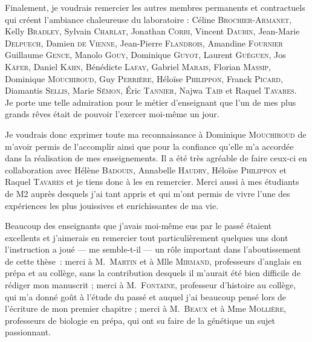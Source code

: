 Finalement, je voudrais remercier les autres membres permanents et contractuels qui créent l'ambiance chaleureuse du laboratoire : 
Céline \textsc{Brochier-Armanet},
Kelly \textsc{Bradley},
Sylvain \textsc{Charlat},
Jonathan \textsc{Corbi},
Vincent \textsc{Daubin},
Jean-Marie \textsc{Delpuech},
Damien \textsc{de Vienne},
Jean-Pierre \textsc{Flandrois},
Amandine \textsc{Fournier}
Guillaume \textsc{Gence},
Manolo \textsc{Gouy},
Dominique \textsc{Guyot},
Laurent \textsc{Guéguen},
Jos \textsc{Käfer},
Daniel \textsc{Kahn},
Bénédicte \textsc{Lafay},
Gabriel \textsc{Marais},
Florian \textsc{Massip},
Dominique \textsc{Mouchiroud},
Guy \textsc{Perrière},
Héloïse \textsc{Philippon},
Franck \textsc{Picard},
Diamantis \textsc{Sellis},
Marie \textsc{Sémon},
\'Eric \textsc{Tannier},
Najwa \textsc{Taib} et
Raquel \textsc{Tavares}.\\






Je porte une telle admiration pour le métier d'enseignant que l'un de mes plus grands rêves était de pouvoir l'exercer moi-même un jour.

Je voudrais donc exprimer toute ma reconnaissance à Dominique \textsc{Mouchiroud} de m'avoir permis de l'accomplir ainsi que pour la confiance qu'elle m'a accordée dans la réalisation de mes enseignements.
Il a été très agréable de faire ceux-ci en collaboration avec Hélène \textsc{Badouin}, Annabelle \textsc{Haudry}, Héloïse \textsc{Philippon} et Raquel \textsc{Tavares} et je tiens donc à les en remercier.
Merci aussi à mes étudiants de M2 auprès desquels j'ai tant appris et qui m'ont permis de vivre l'une des expériences les plus jouissives et enrichissantes de ma vie.

Beaucoup des enseignants que j'avais moi-même eus par le passé étaient excellents et j'aimerais en remercier tout particulièrement quelques uns dont l'instruction a joué — me semble-t-il — un rôle important dans l'aboutissement de cette thèse~: 
merci à M.\ \textsc{Martin} et à Mlle \textsc{Mirmand}, professeurs d'anglais en prépa et au collège, sans la contribution desquels il m'aurait été bien difficile de rédiger mon manuscrit ; 
merci à M.\ \textsc{Fontaine}, professeur d'histoire au collège, qui m'a donné goût à l'étude du passé et auquel j'ai beaucoup pensé lors de l'écriture de mon premier chapitre ; 
merci à M.\ \textsc{Beaux} et à Mme \textsc{Mollière}, professeurs de biologie en prépa, qui ont su faire de la génétique un sujet passionnant.

